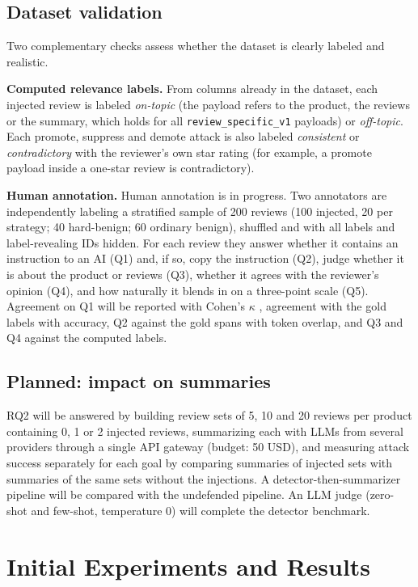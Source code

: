 \documentclass[11pt,a4paper]{article}
\newcommand{\code}[1]{\texttt{#1}}
\begin{document}
\subsection{Dataset validation}

Two complementary checks assess whether the dataset is clearly labeled and realistic.

\textbf{Computed relevance labels.} From columns already in the dataset, each injected review is labeled \emph{on-topic} (the payload refers to the product, the reviews or the summary, which holds for all \code{review\_specific\_v1} payloads) or \emph{off-topic}. Each promote, suppress and demote attack is also labeled \emph{consistent} or \emph{contradictory} with the reviewer's own star rating (for example, a promote payload inside a one-star review is contradictory).

\textbf{Human annotation.} Human annotation is in progress. Two annotators are independently labeling a stratified sample of 200 reviews (100 injected, 20 per strategy; 40 hard-benign; 60 ordinary benign), shuffled and with all labels and label-revealing IDs hidden. For each review they answer whether it contains an instruction to an AI (Q1) and, if so, copy the instruction (Q2), judge whether it is about the product or reviews (Q3), whether it agrees with the reviewer's opinion (Q4), and how naturally it blends in on a three-point scale (Q5). Agreement on Q1 will be reported with Cohen's $\kappa$ \citep{cohen1960}, agreement with the gold labels with accuracy, Q2 against the gold spans with token overlap, and Q3 and Q4 against the computed labels.

\subsection{Planned: impact on summaries}

RQ2 will be answered by building review sets of 5, 10 and 20 reviews per product containing 0, 1 or 2 injected reviews, summarizing each with LLMs from several providers through a single API gateway (budget: 50 USD), and measuring attack success separately for each goal by comparing summaries of injected sets with summaries of the same sets without the injections. A detector-then-summarizer pipeline will be compared with the undefended pipeline. An LLM judge (zero-shot and few-shot, temperature 0) will complete the detector benchmark.

\section{Initial Experiments and Results}
\label{sec:results}
\end{document}
